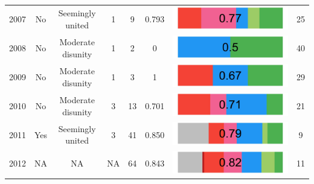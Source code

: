\begin{landscape}
\begin{table}[!htbp]
{\begin{tabular}{cccc|cccc}
2007  &     No      &                        Seemingly united   &                                      1 &                     9 &                     0.793  &        \includegraphics[width = 0.15\columnwidth]{img/ideo2007.jpg}   &         25   \\ 

2008  &     No    &                          Moderate disunity   &                                       1 &                    2 &                     0  &            \includegraphics[width = 0.15\columnwidth]{img/ideo2008.jpg} &           40  \\ 

2009  &     No      &                         Moderate disunity    &                                    1 &                     3 &                     1  &            \includegraphics[width = 0.15\columnwidth]{img/ideo2009.jpg}    &        29  \\ 

2010  &     No     &                          Moderate disunity  &                                      3 &                     13 &                    0.701  &         \includegraphics[width = 0.15\columnwidth]{img/ideo2010.jpg}  &         21   \\ 

2011  &     Yes     &                         Seemingly united  &                                      3 &                     41 &                    0.850    &          \includegraphics[width = 0.15\columnwidth]{img/ideo2011.jpg} &       9   \\ 

2012  &     NA     &                           NA   &                                   NA &                    64 &                    0.843    &          \includegraphics[width = 0.15\columnwidth]{img/ideo2012.jpg}  &      11   \\ 
 

\end{tabular}}
\end{table}
\end{landscape}
